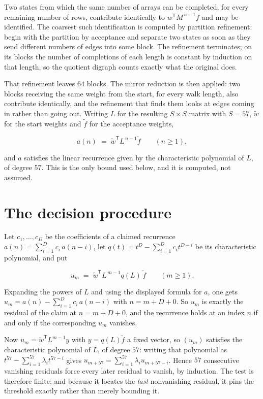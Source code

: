 \documentclass[11pt]{article}
\theoremstyle{definition}
\begin{document}
Two states from which the same number of arrays can be completed, for every remaining number of rows, contribute identically to $w^{\mathsf T}M^{\,n-1}f$ and may be identified. The coarsest such identification is computed by partition refinement: begin with the partition by acceptance and separate two states as soon as they send different numbers of edges into some block. The refinement terminates; on its blocks the number of completions of each length is constant by induction on that length, so the quotient digraph counts exactly what the original does.

That refinement leaves $64$ blocks. The mirror reduction is then applied: two blocks receiving the same weight from the start, for every walk length, also contribute identically, and the refinement that finds them looks at edges coming in rather than going out. Writing $L$ for the resulting $S \times S$ matrix with $S = 57$, $\tilde w$ for the start weights and $\tilde f$ for the acceptance weights,

\[a(n) \;=\; \tilde w^{\mathsf T} L^{\,n-1} \tilde f \qquad (n \ge 1),\]

and $a$ satisfies the linear recurrence given by the characteristic polynomial of $L$, of degree $57$. This is the only bound used below, and it is computed, not assumed.

\section{The decision procedure}

Let $c_1,\dots,c_D$ be the coefficients of a claimed recurrence $a(n) = \sum_{i=1}^{D} c_i\,a(n-i)$, let $q(t) = t^{D} - \sum_{i=1}^{D} c_i t^{D-i}$ be its characteristic polynomial, and put

\[u_m \;=\; \tilde w^{\mathsf T} L^{\,m-1} q(L)\,\tilde f \qquad (m \ge 1).\]

Expanding the powers of $L$ and using the displayed formula for $a$, one gets $u_m = a(n) - \sum_{i=1}^{D} c_i\,a(n-i)$ with $n = m + D + 0$. So $u_m$ is exactly the residual of the claim at $n = m + D + 0$, and the recurrence holds at an index $n$ if and only if the corresponding $u_m$ vanishes.

Now $u_m = \tilde w^{\mathsf T} L^{m-1} y$ with $y = q(L)\tilde f$ a fixed vector, so $(u_m)$ satisfies the characteristic polynomial of $L$, of degree $57$: writing that polynomial as $t^{57} - \sum_{i=1}^{57} \lambda_i t^{57-i}$ gives $u_{m+57} = \sum_{i=1}^{57} \lambda_i u_{m+57-i}$. Hence $57$ consecutive vanishing residuals force every later residual to vanish, by induction. The test is therefore finite; and because it locates the {\itshape last} nonvanishing residual, it pins the threshold exactly rather than merely bounding it.
\end{document}
